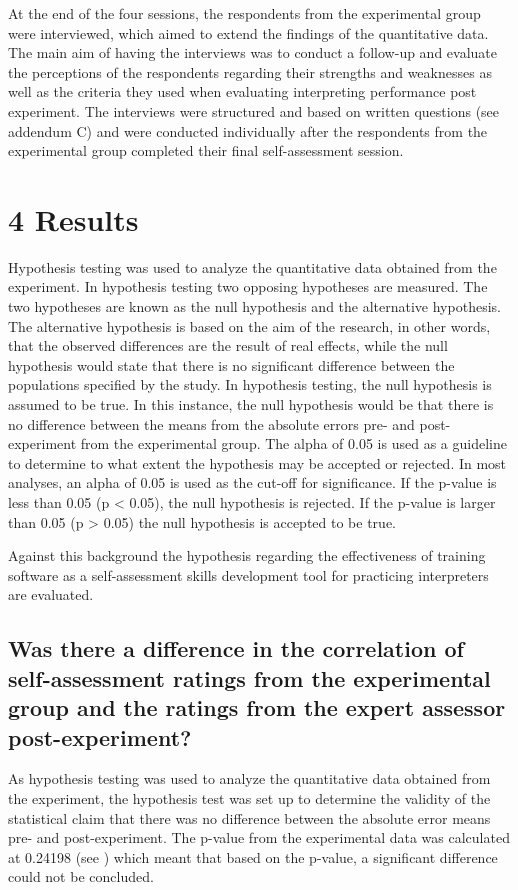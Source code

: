 \documentclass[output=paper]{langsci/langscibook}
\begin{document}
At the end of the four sessions, the respondents from the experimental group were interviewed, which aimed to extend the findings of the quantitative data. The main aim of having the interviews was to conduct a follow-up and evaluate the perceptions of the respondents regarding their strengths and weaknesses as well as the criteria they used when evaluating interpreting performance post experiment. The interviews were structured and based on written questions (see addendum C) and were conducted individually after the respondents from the experimental group completed their final self-assessment session.

\section{4 Results}
Hypothesis testing was used to analyze the quantitative data obtained from the experiment. In hypothesis testing two opposing hypotheses are measured. The two hypotheses are known as the null hypothesis and the alternative hypothesis. The alternative hypothesis is based on the aim of the research, in other words, that the observed differences are the result of real effects, while the null hypothesis would state that there is no significant difference between the populations specified by the study. In hypothesis testing, the null hypothesis is assumed to be true. In this instance, the null hypothesis would be that there is no difference between the means from the absolute errors pre- and post-experiment from the experimental group. The alpha of 0.05 is used as a guideline to determine to what extent the hypothesis may be accepted or rejected. In most analyses, an alpha of 0.05 is used as the cut-off for significance. If the p-value is less than 0.05 (p < 0.05), the null hypothesis is rejected. If the p-value is larger than 0.05 (p > 0.05) the null hypothesis is accepted to be true. 


Against this background the hypothesis regarding the effectiveness of training software as a self-assessment skills development tool for practicing interpreters are evaluated.


\subsection{Was there a difference in the correlation of self-assessment ratings from the experimental group and the ratings from the expert assessor post-experiment?}

As hypothesis testing was used to analyze the quantitative data obtained from the experiment, the hypothesis test was set up to determine the validity of the statistical claim that there was no difference between the absolute error means pre- and post-experiment. The p-value from the experimental data was calculated at 0.24198 (see ) which meant that based on the p-value, a significant difference could not be concluded.
\end{document}

